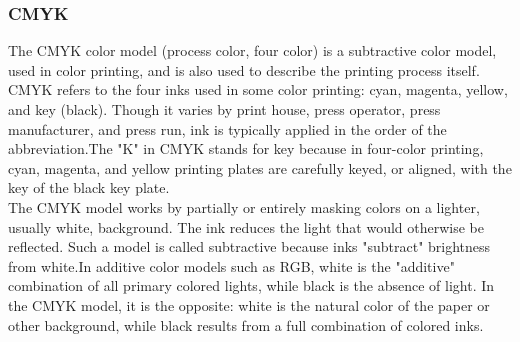 \subsubsection{CMYK}
The CMYK color model (process color, four color) is a subtractive color model, used in color printing, and is also used to describe the printing process itself. CMYK refers to the four inks used in some color printing: cyan, magenta, yellow, and key (black). Though it varies by print house, press operator, press manufacturer, and press run, ink is typically applied in the order of the abbreviation.The "K" in CMYK stands for key because in four-color printing, cyan, magenta, and yellow printing plates are carefully keyed, or aligned, with the key of the black key plate.\\
The CMYK model works by partially or entirely masking colors on a lighter, usually white, background. The ink reduces the light that would otherwise be reflected. Such a model is called subtractive because inks "subtract" brightness from white.In additive color models such as RGB, white is the "additive" combination of all primary colored lights, while black is the absence of light. In the CMYK model, it is the opposite: white is the natural color of the paper or other background, while black results from a full combination of colored inks.

